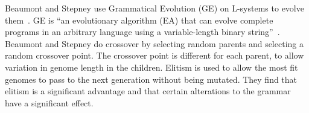 Beaumont and Stepney use Grammatical Evolution (GE) on L-systems to evolve them~\cite{Beaumont2009}.
GE is ``an evolutionary algorithm (EA) that can evolve complete programs in an arbitrary language using a variable-length binary string''~\cite{Oneil2003}.
Beaumont and Stepney do crossover by selecting random parents and selecting a random crossover point.
The crossover point is different for each parent, to allow variation in genome length in the children.
Elitism is used to allow the most fit genomes to pass to the next generation without being mutated.
They find that elitism is a significant advantage and that certain alterations to the grammar have a significant effect.
